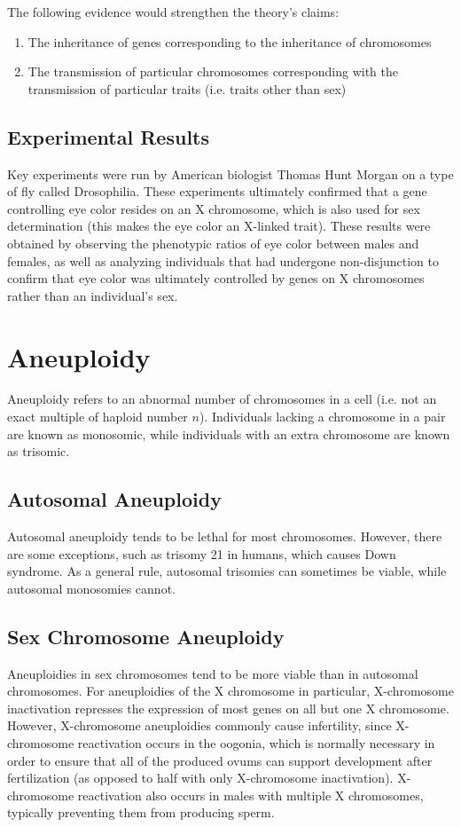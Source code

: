 \documentclass[12pt,titlepage]{article}
\begin{document}
        The following evidence would strengthen the theory's claims:
        \begin{enumerate}
          \item The inheritance of genes corresponding to the inheritance of chromosomes
          \item The transmission of particular chromosomes corresponding with the transmission of particular traits (i.e. traits other than sex)
        \end{enumerate}

        \subsection{Experimental Results}
          Key experiments were run by American biologist Thomas Hunt Morgan on a type of fly called Drosophilia. These experiments ultimately
          confirmed that a gene controlling eye color resides on an X chromosome, which is also used for sex determination (this makes the eye
          color an X-linked trait). These results were obtained by observing the phenotypic ratios of eye color between males and females, as
          well as analyzing individuals that had undergone non-disjunction to confirm that eye color was ultimately controlled by genes on X
          chromosomes rather than an individual's sex.

    \section{Aneuploidy}
      Aneuploidy refers to an abnormal number of chromosomes in a cell (i.e. not an exact multiple of haploid number $n$). Individuals lacking a
      chromosome in a pair are known as monosomic, while individuals with an extra chromosome are known as trisomic.

      \subsection{Autosomal Aneuploidy}
        Autosomal aneuploidy tends to be lethal for most chromosomes. However, there are some exceptions, such as trisomy 21 in humans, which
        causes Down syndrome. As a general rule, autosomal trisomies can sometimes be viable, while autosomal monosomies cannot.

      \subsection{Sex Chromosome Aneuploidy}
        Aneuploidies in sex chromosomes tend to be more viable than in autosomal chromosomes. For aneuploidies of the X chromosome in particular,
        X-chromosome inactivation represses the expression of most genes on all but one X chromosome. However, X-chromosome aneuploidies commonly
        cause infertility, since X-chromosome reactivation occurs in the oogonia, which is normally necessary in order to ensure that all of
        the produced ovums can support development after fertilization (as opposed to half with only X-chromosome inactivation). X-chromosome
        reactivation also occurs in males with multiple X chromosomes, typically preventing them from producing sperm.
\end{document}
